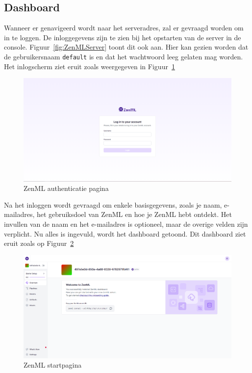 \subsection{Dashboard}
Wanneer er genavigeerd wordt naar het serveradres, zal er gevraagd worden om in te loggen. De inloggegevens zijn te zien bij het opstarten van de server in de console. Figuur~\ref{fig:ZenMLServer} toont dit ook aan. Hier kan gezien worden dat de gebruikersnaam \texttt{default} is en dat het wachtwoord leeg gelaten mag worden. Het inlogscherm ziet eruit zoals weergegeven in Figuur~\ref{fig:ZenML_Login}
\begin{figure}[h]
    \centering
    \includegraphics[width=0.9\linewidth]{graphics/ZenML_Login.PNG}
    \caption{ZenML authenticatie pagina}
    \label{fig:ZenML_Login}
\end{figure}
Na het inloggen wordt gevraagd om enkele basisgegevens, zoals je naam, e-mailadres, het gebruiksdoel van ZenML en hoe je ZenML hebt ontdekt. Het invullen van de naam en het e-mailadres is optioneel, maar de overige velden zijn verplicht.
Nu alles is ingevuld, wordt het dashboard getoond. Dit dashboard ziet eruit zoals op Figuur~\ref{fig:ZenML_Overview}
\begin{figure}[h]
    \centering
    \includegraphics[width=0.9\linewidth]{graphics/ZenML_Overview.PNG}
    \caption{ZenML startpagina}
    \label{fig:ZenML_Overview}
\end{figure}

